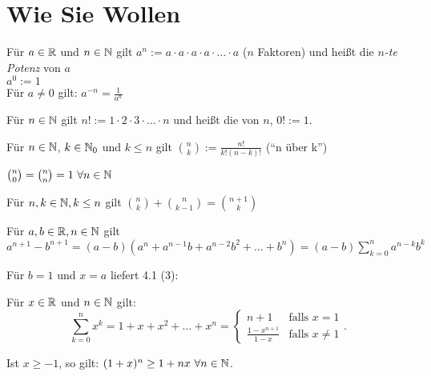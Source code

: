 \documentclass[a4paper,twoside,DIV15,BCOR12mm]{scrbook}
\begin{document}
\chapter{Wie Sie Wollen}

\begin{definition}
\begin{liste}
\item Für $a \in\mathbb{R}$ und $n\in\mathbb{N}$ gilt $a^n := a\cdot a\cdot a\cdot a\cdot \ldots \cdot a$ ($n$ Faktoren) und heißt die \textit{$n$-te Potenz} von $a$\\
    $a^0:=1$ \\
    Für $a\ne 0$ gilt: $a^{-n}=\frac{1}{a^n}$ 
\item Für $n\in\mathbb{N}$ gilt $n! := 1\cdot 2\cdot 3\cdot \ldots \cdot n $ und heißt die  von $n$, $0! := 1$.
\item Für $n\in\mathbb{N}$, $k\in\mathbb{N}_{0}$ und $k\le n$ gilt $\binom{n}{k}:=\frac{n!}{k!(n-k)!}$ ("`n über k"')
\end{liste}
\end{definition}

\begin{satz}
\begin{liste}
\item $\binom{n}{0}=\binom{n}{n}=1\ \forall n\in\mathbb{N}$
\item Für $n,k\in\mathbb{N}, k\le n$ gilt $\binom{n}{k}+\binom{n}{k-1}=\binom{n+1}{k}$
\item Für $a,b\in\mathbb{R}, n\in\mathbb{N}$ gilt $a^{n+1}-b^{n+1}=(a-b)(a^n+a^{n-1}b+a^{n-2}b^2+\ldots+b^n) = (a-b) \sum_{k=0}^n a^{n-k}b^k$
\end{liste}
\end{satz}

\begin{satz}[Folgerung]
Für $b=1$ und $x=a$ liefert 4.1 (3):

Für $x\in\mathbb{R}$ und $n\in\mathbb{N}$ gilt:
$$\sum_{k=0}^{n}{x^k}=1+x+x^2+\ldots+x^n=\begin{cases}
 n+1&  \text{falls }x=1\\
 \frac{1-x^{n+1}}{1-x}&  \text{falls }x\ne1
 \end{cases}\text{.}$$
\end{satz}

\begin{satz}
Ist $x\ge-1$, so gilt: $(1+x)^n\ge1+nx\ \forall n\in\mathbb{N}$.
\end{satz}
\end{document}
